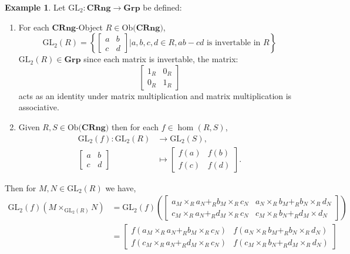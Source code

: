 \documentclass[11pt,a4paper]{article}
\theoremstyle{definition}
\newtheorem{example}[thm]{Example}
\newcommand\ho[3][]{\hom_{#1}(#2,#3)}
\newcommand\ob[1]{\mathrm{Ob(}#1\mathrm{)}}
\newcommand{\GL}{\mathrm{GL}_{2}}
\numberwithin{equation}{section}
\begin{document}
\begin{example}
\label{exe:matrixringfunc}
Let $\GL\colon\mathbf{CRng}\rightarrow\mathbf{Grp}$ be defined:
\begin{enumerate}
    \item For each $\mathbf{CRng}$-Object $R\in\ob{\mathbf{CRng}}$,
    \[\GL(R)=\left\{\begin{bmatrix}
        a&b\\
        c&d
    \end{bmatrix} | a,b,c,d\in R, ab-cd \text{ is invertable in }R\right\}
    \]
    $\GL(R)\in\mathbf{Grp}$ since each matrix is invertable, the matrix:\[\begin{bmatrix}1_{R}&0_{R}\\0_{R}&1_{R}\end{bmatrix}\] acts as an identity under matrix multiplication and matrix multiplication is associative.
    \item Given $R,S\in\ob{\mathbf{CRng}}$ then for each $f\in\ho{R}{S}$,
    \begin{align*}
        \GL(f)\colon \GL(R)&\rightarrow \GL(S),\\
    \begin{bmatrix} 
    a & b\\
    c&d
    \end{bmatrix}&\mapsto \begin{bmatrix} 
    f(a) & f(b)\\
    f(c) & f(d)
    \end{bmatrix}.
    \end{align*}
\end{enumerate}
Then for $M,N\in \GL(R)$ we have,
\begin{align*}
    \GL(f)(M \times_{\GL(R)} N) &= \GL(f)\left(\begin{bmatrix} 
    a_{M} \times_{R}a_{N}+_{R}b_{M}\times_{R}c_{N}& a_{N}\times_{R}b_{M}+_{R}b_{N}\times_{R}d_{N}\\
    c_{M}\times_{R}a_{N}+_{R}d_{M}\times_{R}c_{N}& c_{M}\times_{R}b_{N}+_{R}d_{M}\times d_{N}
    \end{bmatrix}\right)\\
    &= \begin{bmatrix} 
    f(a_{M} \times_{R}a_{N}+_{R}b_{M}\times_{R}c_{N})& f(a_{N}\times_{R}b_{M}+_{R}b_{N}\times_{R}d_{N})\\
f(c_{M}\times_{R}a_{N}+_{R}d_{M}\times_{R}c_{N})& f(c_{M}\times_{R}b_{N}+_{R}d_{M}\times_{R} d_{N})
    \end{bmatrix}\\

\end{align*}
\end{example}
\end{document}
